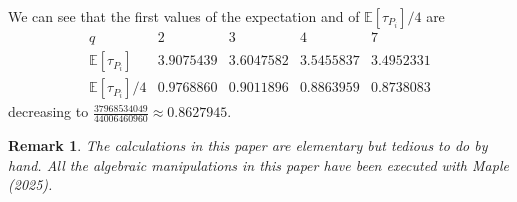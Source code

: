 \documentclass{article}
\newtheorem{remark}{Remark}
\newcommand{\E}{\mathbb{E}}
\begin{document}
We can see that the first values of the expectation and of $\E[\tau_{P_i}]/4$ are
\[
\renewcommand{\arraystretch}{1.3}
\begin{array}{lcccc}
q & 2 & 3 & 4 & 7\\\hline
\E[\tau_{P_i}] & 3.9075439 & 3.6047582 & 3.5455837 & 3.4952331\\
\E[\tau_{P_i}]/4 & 0.9768860 & 0.9011896 & 0.8863959 & 0.8738083
\end{array}
\]
decreasing to $\tfrac{37968534049}{44006460960}\approx0.8627945$.

\begin{remark} The calculations in this paper are elementary but tedious to do by hand. All the algebraic manipulations in this paper have been executed with Maple (2025).
\end{remark}
\end{document}
